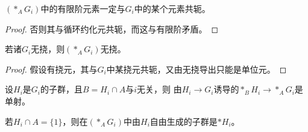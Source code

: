 \begin{corollary}
    $(*_A G_i)$中的有限阶元素一定与$G_i$中的某个元素共轭。
\end{corollary}
\begin{proof}
    否则其与循环约化元共轭，而这与有限阶矛盾。
\end{proof}
\begin{corollary}
    若诸$G_i$无挠，则$(*_A G_i)$无挠。
\end{corollary}
\begin{proof}
    假设有挠元，其与$G_i$中某挠元共轭，又由无挠导出只能是单位元。
\end{proof}
\begin{proposition}
    设$H_i$是$G_i$的子群，且$B = H_i \cap A$与$i$无关，则
    由$H_i \to G_i$诱导的$*_B H_i \to *_A G_i$是单射。
\end{proposition}
\begin{corollary}
    若$H_i \cap A = \{1\}$，则在$(*_A G_i)$中由$H_i$自由生成的子群是$*H_i$。
\end{corollary}
